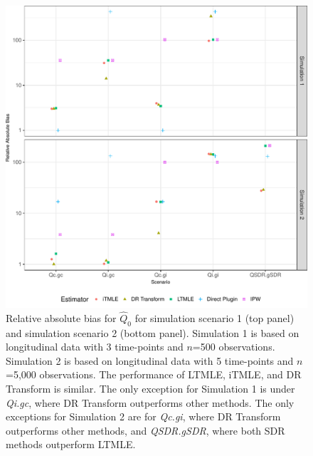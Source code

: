 \documentclass{article}\usepackage[]{graphicx}\usepackage[]{color}
\newenvironment{knitrout}{}{} %
\begin{document}
\begin{knitrout}
\color{fgcolor}\begin{figure}[H]

{\centering \includegraphics[width=.65\linewidth]{figure/plot-simres_all_BIAS-1} 

}

\caption{Relative absolute bias for $\hat{Q}_0$ for simulation scenario 1 (top panel) and simulation scenario 2 (bottom panel). Simulation 1 is based on longitudinal data with 3 time-points and $n$=500 observations. Simulation 2 is based on longitudinal data with 5 time-points and $n$=5,000 observations. The performance of LTMLE, iTMLE, and DR Transform is similar. The only exception for Simulation 1 is under \textit{Qi.gc}, where DR Transform outperforms other methods. The only exceptions for Simulation 2 are for \textit{Qc.gi}, where DR Transform outperforms other methods, and \textit{QSDR.gSDR}, where both SDR methods outperform LTMLE.}\label{fig:simres.all.BIAS}
\end{figure}


\end{knitrout}
\end{document}
